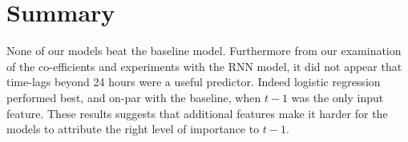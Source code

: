 \section{Summary}

None of our models beat the baseline model. Furthermore from our examination of the co-efficients and experiments with the RNN model, it did not appear that time-lags beyond 24 hours were a useful predictor. Indeed logistic regression performed best, and on-par with the baseline, when $t-1$ was the only input feature. These results suggests that additional features make it harder for the models to attribute the right level of importance to $t-1$. 